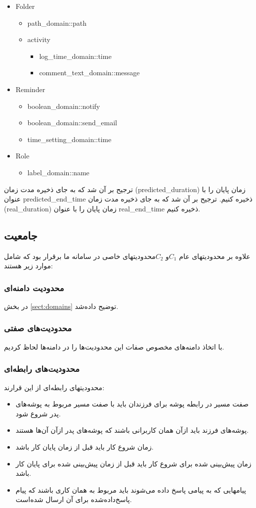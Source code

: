\documentclass{article}
\begin{document}
\begin{itemize}
\item Folder
	\begin{itemize}
	\item path\_domain::path
	\item activity	
		\begin{itemize}
		\item log\_time\_domain::time
		\item comment\_text\_domain::message
		\end{itemize}
	\end{itemize}
\item Reminder
	\begin{itemize}
	\item boolean\_domain::notify
	\item boolean\_domain::send\_email
	\item time\_setting\_domain::time
	\end{itemize}
\item Role
	\begin{itemize}
	\item label\_domain::name
	\end{itemize}
\end{itemize}
\persian
ترجیح بر آن شد که به جای ذخیره مدت زمان (predicted\_duration) زمان پایان را با عنوان predicted\_end\_time ذخیره کنیم. 
ترجیح بر آن شد که به جای ذخیره مدت زمان (real\_duration) زمان پایان را با عنوان real\_end\_time ذخیره کنیم. 
\subsection*{جامعیت}
علاوه بر محدودیتهای عام $C_1 $و $ C_2$محدودیتهای خاصی در سامانه ما برقرار بود که شامل موارد زیر هستند:
\subsubsection*{محدودیت دامنه‌ای}
در بخش 
\ref{sect:domains}
توضیح داده‌شد.
\subsubsection*{محدودیت‌های صفتی}
با اتخاذ دامنه‌های مخصوص صفات این محدودیت‌ها را در دامنه‌ها لحاظ کردیم.
\subsubsection*{محدودیت‌های رابطه‌ای}
محدودیتهای رابطه‌ای از این قرارند:
\begin{itemize}
\item
صفت مسیر
  در رابطه پوشه
    برای فرزندان باید با صفت مسیر مربوط به پوشه‌های پدر شروع شود. 
\item
پوشه‌های فرزند باید ازآن همان کاربرانی باشند که پوشه‌های پدر ازآن آن‌ها هستند. 
\item
زمان شروع کار
 باید قبل از زمان پایان کار باشد. 
\item
زمان پیش‌بینی شده برای شروع کار باید قبل از زمان پیش‌بینی شده برای پایان کار باشد. 
\item
پیامهایی که به پیامی پاسخ داده می‌شوند باید مربوط به همان کاری باشند که پیام پاسخ‌داده‌شده برای آن ارسال شده‌است. 
\end{itemize}
\end{document}
